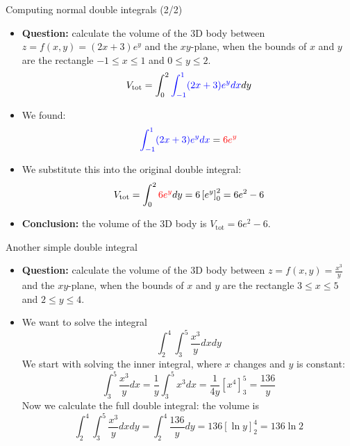 \begin{frame}{Computing normal double integrals (2/2)}
    \begin{itemize}
        \item \textbf{Question:} calculate the volume of the 3D body between $z=f(x,y)=(2x+3)e^y$ and the $xy$-plane, when the bounds of $x$ and $y$ are the rectangle $-1\leq x\leq1$ and $0\leq y\leq2$.
            \[V_{\text{tot}}=\int_{0}^{2}\textcolor{blue}{\int_{-1}^{1}(2x+3)e^y dx}dy\]
        \item We found:
            \[\textcolor{blue}{\int_{-1}^{1}(2x+3)e^y dx}=\textcolor{red}{6e^y}\]
        \item We substitute this into the original double integral:
            \[V_{\text{tot}}=\int_{0}^{2}\textcolor{red}{6e^y}dy=6\left[e^y\right]_0^2=6e^2-6\]
        \item \textbf{Conclusion:} the volume of the 3D body is $\boxed{V_{\text{tot}}=6e^2-6}$.
    \end{itemize}
\end{frame}


\begin{frame}{Another simple double integral}
    \begin{itemize}
        \item \textbf{Question:} calculate the volume of the 3D body between $z=f(x,y)=\frac{x^3}{y}$ and the $xy$-plane, when the bounds of $x$ and $y$ are the rectangle $3\leq x\leq5$ and $2\leq y\leq4$.
        \item We want to solve the integral
            \[\int_2^4\int_3^5\frac{x^3}{y}dxdy\]
            We start with solving the inner integral, where $x$ changes and $y$ is constant:
            \[\int_3^5\frac{x^3}{y}dx=\frac{1}{y}\int_3^5x^3dx=\frac{1}{4y}\left[x^4\right]_3^5=\frac{136}{y}\]
            Now we calculate the full double integral: the volume is
            \[\int_2^4\int_3^5\frac{x^3}{y}dxdy=\int_2^4\frac{136}{y}dy=136\left[\ln y\right]_2^4=\boxed{136\ln2}\]
    \end{itemize}
\end{frame}

